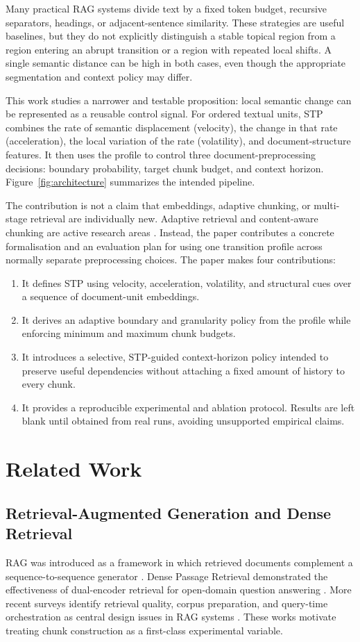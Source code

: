 \documentclass[conference]{IEEEtran}
\begin{document}
Many practical RAG systems divide text by a fixed token budget, recursive separators, headings, or adjacent-sentence similarity. These strategies are useful baselines, but they do not explicitly distinguish a stable topical region from a region entering an abrupt transition or a region with repeated local shifts. A single semantic distance can be high in both cases, even though the appropriate segmentation and context policy may differ.

This work studies a narrower and testable proposition: local semantic change can be represented as a reusable control signal. For ordered textual units, STP combines the rate of semantic displacement (velocity), the change in that rate (acceleration), the local variation of the rate (volatility), and document-structure features. It then uses the profile to control three document-preprocessing decisions: boundary probability, target chunk budget, and context horizon. Figure~\ref{fig:architecture} summarizes the intended pipeline.

The contribution is not a claim that embeddings, adaptive chunking, or multi-stage retrieval are individually new. Adaptive retrieval and content-aware chunking are active research areas \parencite{gao2024retrieval,edge2024local}. Instead, the paper contributes a concrete formalisation and an evaluation plan for using one transition profile across normally separate preprocessing choices. The paper makes four contributions:
\begin{enumerate}
    \item It defines STP using velocity, acceleration, volatility, and structural cues over a sequence of document-unit embeddings.
    \item It derives an adaptive boundary and granularity policy from the profile while enforcing minimum and maximum chunk budgets.
    \item It introduces a selective, STP-guided context-horizon policy intended to preserve useful dependencies without attaching a fixed amount of history to every chunk.
    \item It provides a reproducible experimental and ablation protocol. Results are left blank until obtained from real runs, avoiding unsupported empirical claims.
\end{enumerate}

\section{Related Work}
\subsection{Retrieval-Augmented Generation and Dense Retrieval}
RAG was introduced as a framework in which retrieved documents complement a sequence-to-sequence generator \parencite{lewis2020retrieval}. Dense Passage Retrieval demonstrated the effectiveness of dual-encoder retrieval for open-domain question answering \parencite{karpukhin2020dense}. More recent surveys identify retrieval quality, corpus preparation, and query-time orchestration as central design issues in RAG systems \parencite{gao2024retrieval}. These works motivate treating chunk construction as a first-class experimental variable.
\end{document}
